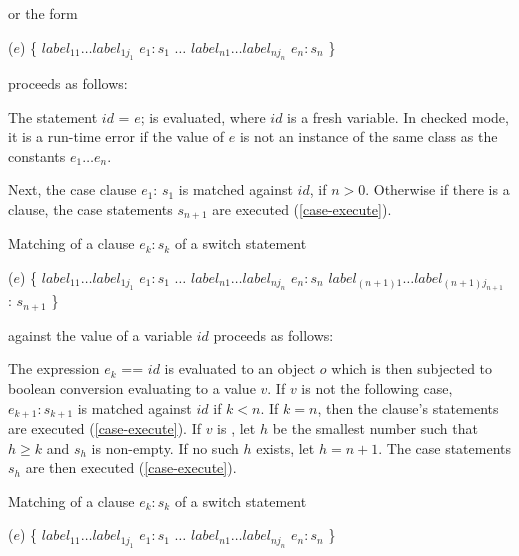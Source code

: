 \documentclass{article}
\newcommand{\code}[1]{{\sf #1}}
\begin{document}
or the form

\begin{dartCode}
\SWITCH{} ($e$) \{
   $label_{11} \ldots label_{1j_1}$ \CASE{} $e_1: s_1$
   $\ldots$
   $label_{n1} \ldots label_{nj_n}$ \CASE{} $e_n: s_n$
\}
\end{dartCode}

proceeds as follows:

\LMHash{}
The statement \code{\VAR{} $id$ = $e$;} is evaluated, where $id$ is a fresh variable. In checked mode, it is a run-time error if the value of $e$ is not an instance of the same class as the constants $e_1 \ldots e_n$.


\LMHash{}
Next, the case clause \CASE{} $e_{1}$: $s_{1}$ is matched against $id$, if $n > 0$. Otherwise if there is a \DEFAULT{} clause, the case statements $s_{n+1}$ are executed (\ref{case-execute}).

\LMHash{}
Matching of a \CASE{} clause \CASE{} $e_{k}: s_{k}$ of a switch statement

\begin{dartCode}
\SWITCH{} ($e$) \{
   $label_{11} \ldots label_{1j_1}$ \CASE{} $e_1: s_1$
   $\ldots$
   $label_{n1} \ldots label_{nj_n}$ \CASE{} $e_n: s_n$
   $label_{(n+1)1} \ldots label_{(n+1)j_{n+1}}$ \DEFAULT{}: $s_{n+1}$
\}
\end{dartCode}

against the value of a variable $id$ proceeds as follows:

\LMHash{}
The expression \code{$e_k$ == $id$} is evaluated to an object $o$ which is then subjected to boolean conversion evaluating to a value $v$.
If $v$ is not \TRUE{} the following case, \CASE{} $e_{k+1}: s_{k+1}$ is matched against $id$ if $k < n$. If $k = n$, then the \DEFAULT{} clause's statements are executed (\ref{case-execute}).
If $v$ is \TRUE{}, let $h$ be the smallest number such that $h \ge k$ and $s_h$ is non-empty. If no such $h$ exists, let $h = n + 1$. The case statements $s_h$ are then executed (\ref{case-execute}).

\LMHash{}
Matching of a \CASE{} clause \CASE{} $e_{k}: s_{k}$ of a switch statement

\begin{dartCode}
\SWITCH{} ($e$) \{
   $label_{11} \ldots label_{1j_1}$ \CASE{} $e_1: s_1$
   $\ldots$
   $label_{n1} \ldots label_{nj_n}$ \CASE{} $e_n: s_n$
\}
\end{dartCode}
\end{document}
